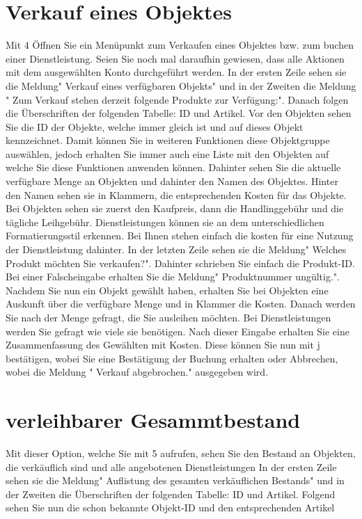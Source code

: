 ﻿\documentclass[a4paper,12pt,titlepage]{article}
\begin{document}
\section{Verkauf eines Objektes}
Mit 4 Öffnen Sie ein Menüpunkt zum Verkaufen eines Objektes bzw.  zum buchen einer Dienstleistung. Seien Sie noch mal daraufhin gewiesen, dass alle Aktionen mit dem ausgewählten Konto durchgeführt werden.
In der ersten Zeile sehen sie die Meldung" Verkauf eines verfügbaren Objekts" und in der Zweiten die Meldung " Zum Verkauf stehen derzeit folgende Produkte zur Verfügung:". Danach folgen die Überschriften der folgenden Tabelle: ID und Artikel.
Vor den Objekten sehen Sie die ID der Objekte, welche immer gleich ist und auf dieses Objekt kennzeichnet. Damit können Sie in weiteren Funktionen diese Objektgruppe auswählen, jedoch erhalten Sie immer auch eine Liste mit den Objekten auf welche Sie diese Funktionen anwenden können.
Dahinter sehen Sie die aktuelle verfügbare Menge an Objekten und dahinter den Namen des Objektes.
Hinter den Namen sehen sie in Klammern, die entsprechenden Kosten für das Objekte. Bei Objekten sehen sie zuerst den Kaufpreis, dann die Handlinggebühr und die tägliche Leihgebühr.
Dienstleistungen können sie an dem unterschiedlichen Formatierungsstil erkennen. Bei Ihnen stehen einfach die kosten für eine Nutzung der Dienstleistung dahinter.
In der letzten Zeile sehen sie die Meldung" Welches Produkt möchten Sie verkaufen?". Dahinter schrieben Sie einfach die Produkt-ID. Bei einer Falscheingabe erhalten Sie die Meldung" Produktnummer ungültig.".
Nachdem Sie nun ein Objekt gewählt haben, erhalten Sie bei Objekten eine Auskunft über die verfügbare Menge und in Klammer die Kosten. Danach werden Sie nach der Menge gefragt, die Sie ausleihen möchten. 
Bei Dienstleistungen werden Sie gefragt wie viele sie benötigen.
Nach dieser Eingabe erhalten Sie eine Zusammenfassung des Gewählten mit Kosten. 
Diese können Sie nun mit j bestätigen, wobei Sie eine Bestätigung der Buchung erhalten oder Abbrechen, wobei die Meldung " Verkauf abgebrochen." ausgegeben wird. 
\section{verleihbarer Gesammtbestand}
Mit dieser Option, welche Sie mit 5 aufrufen, sehen Sie den Bestand an Objekten, die verkäuflich sind und alle angebotenen Dienstleistungen
 In der ersten Zeile sehen sie die Meldung" Auflistung des gesamten verkäuflichen Bestands" und in der Zweiten die Überschriften der folgenden Tabelle: ID und Artikel.
Folgend sehen Sie nun die schon bekannte Objekt-ID und den entsprechenden Artikel
\end{document}
